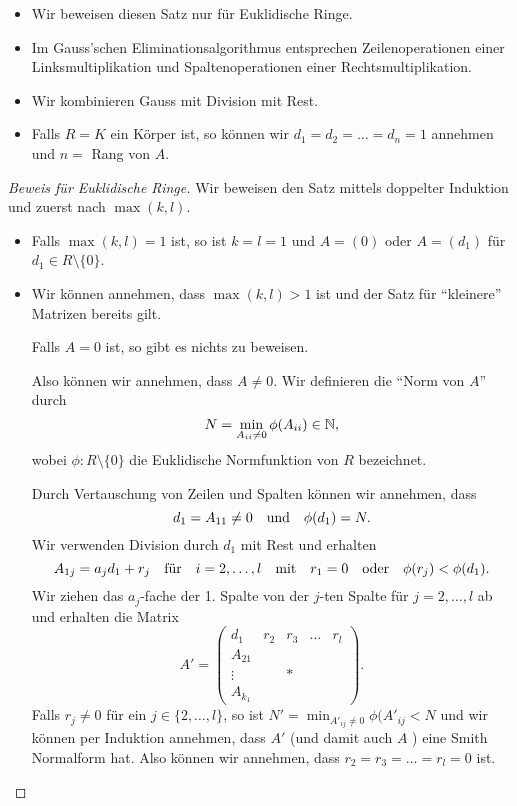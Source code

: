 \begin{itemize}
	\item Wir beweisen diesen Satz nur für Euklidische Ringe.
	\item Im Gauss'schen Eliminationsalgorithmus entsprechen Zeilenoperationen einer Linksmultiplikation und Spaltenoperationen einer Rechtsmultiplikation.
	\item Wir kombinieren Gauss mit Division mit Rest.
	\item Falls $R = K$ ein Körper ist, so können wir $d_1 = d_2 = \ldots = d_{n} = 1$ annehmen und $n = $ Rang von  $A$.
\end{itemize}

\begin{proof}[Beweis für Euklidische Ringe]
	Wir beweisen den Satz mittels doppelter Induktion und zuerst nach $\max(k,l)$.
	\begin{itemize}
		\item Falls $\max(k,l) = 1$ ist, so ist $k=l=1$ und $A = (0)$ oder $A = (d_1)$ für $d_1 \in R \setminus \{0\} $.
		\item Wir können annehmen, dass $\max(k,l) > 1$ ist und der Satz für \enquote{kleinere} Matrizen bereits gilt.

			Falls $A = 0$ ist, so gibt es nichts zu beweisen.

			Also können wir annehmen, dass $A \neq 0$. Wir definieren die \enquote{Norm von $A$} durch 
			\[
				N = \min_{A_{ii} \neq 0} \phi(A_{ii}) \in \mathbb{N},
			\] 
			wobei $\phi: R \setminus \{0\} $ die Euklidische Normfunktion von $R$ bezeichnet.

			Durch Vertauschung von Zeilen und Spalten können wir annehmen, dass 
			\[
				d_1 = A_{11} \neq 0 \qq{und} \phi(d_1) = N
			.\] 
			Wir verwenden Division durch $d_1$ mit Rest und erhalten
			\[
				A_{1 j} = a_{j} d_1 + r_{j} \qq{für} i = 2,\ldots,l \qq{mit} r_1 = 0 \qq{oder} \phi(r_{j}) < \phi(d_1)
			.\] 
			Wir ziehen das $a_{j}$-fache der 1. Spalte von der $j$-ten Spalte für $j=2,\ldots,l$ ab und erhalten die Matrix
			\[
			A' = \begin{pmatrix} 
				d_1 &r_2 &r_3 &\ldots &r_{l}\\
				A_{21}\\
				\vdots & &*\\
				A_{k_1}
			\end{pmatrix} 
			.\]
			Falls $r_{j} \neq 0$ für ein $j \in \{2, \ldots, l\} $, so ist $N' = \min_{A'_{ij}\neq 0} \phi(A'_{ij} < N$ und wir
			können per Induktion annehmen, dass $A'$ (und damit auch $A$ ) eine Smith Normalform hat.
			Also können wir annehmen, dass $r_2 = r_3 = \ldots = r_{l} = 0$ ist.
			

\end{itemize}
\end{proof}
